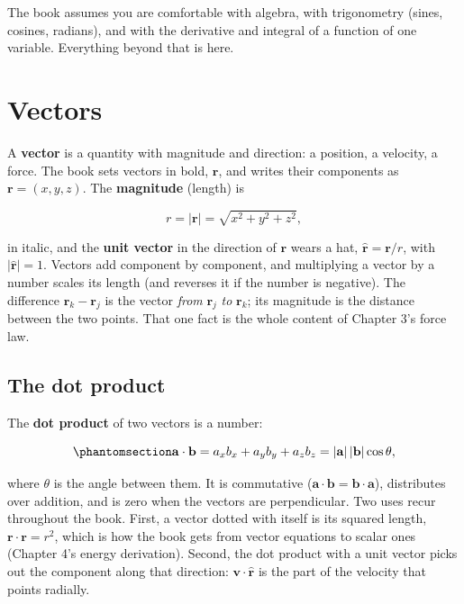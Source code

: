 \documentclass[
  10.5pt,
  letterpaper,
]{scrbook}
\theoremstyle{definition}
\theoremstyle{plain}
\theoremstyle{remark}
\begin{document}
The book assumes you are comfortable with algebra, with trigonometry
(sines, cosines, radians), and with the derivative and integral of a
function of one variable. Everything beyond that is here.

\section{Vectors}\label{vectors}

A \textbf{vector} is a quantity with magnitude and direction: a
position, a velocity, a force. The book sets vectors in bold,
\(\mathbf{r}\), and writes their components as
\(\mathbf{r} = (x, y, z)\). The \textbf{magnitude} (length) is

\[
r = |\mathbf{r}| = \sqrt{x^2 + y^2 + z^2},
\]

in italic, and the \textbf{unit vector} in the direction of
\(\mathbf{r}\) wears a hat, \(\hat{\mathbf{r}} = \mathbf{r}/r\), with
\(|\hat{\mathbf{r}}| = 1\). Vectors add component by component, and
multiplying a vector by a number scales its length (and reverses it if
the number is negative). The difference \(\mathbf{r}_k - \mathbf{r}_j\)
is the vector \emph{from} \(\mathbf{r}_j\) \emph{to} \(\mathbf{r}_k\);
its magnitude is the distance between the two points. That one fact is
the whole content of Chapter 3's force law.

\subsection{The dot product}\label{the-dot-product}

The \textbf{dot product} of two vectors is a number:

\begin{equation}\protect\phantomsection\label{eq-dot}{
\mathbf{a}\cdot\mathbf{b} = a_x b_x + a_y b_y + a_z b_z = |\mathbf{a}|\,|\mathbf{b}|\cos\theta,
}\end{equation}

where \(\theta\) is the angle between them. It is commutative
(\(\mathbf{a}\cdot\mathbf{b} = \mathbf{b}\cdot\mathbf{a}\)), distributes
over addition, and is zero when the vectors are perpendicular. Two uses
recur throughout the book. First, a vector dotted with itself is its
squared length, \(\mathbf{r}\cdot\mathbf{r} = r^2\), which is how the
book gets from vector equations to scalar ones (Chapter 4's energy
derivation). Second, the dot product with a unit vector picks out the
component along that direction: \(\mathbf{v}\cdot\hat{\mathbf{r}}\) is
the part of the velocity that points radially.
\end{document}
